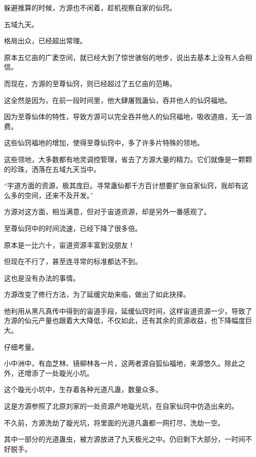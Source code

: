 
\begin{this_body}



躲避推算的时候，方源也不闲着，趁机视察自家的仙窍。

五域九天。

格局出众，已经超出常理。

原本五亿亩的广袤空间，就已经大到了惊世骇俗的地步，说出去基本上没有人会相信。

而现在，方源的至尊仙窍，则已经超过了五亿亩的范畴。

这全然是因为，在前一段时间里，他大肆屠戮蛊仙，吞并他人的仙窍福地。

因为至尊仙体的特性，导致方源可以完全吞并他人的仙窍福地，吸收道痕，无一浪费。

这些仙窍福地的增加，使得至尊仙窍中，多了许多片特殊的领地。

这些领地，大多数都有地灵调控管理，省去了方源大量的精力。它们就像是一颗颗的珍珠，洒落在五域九天当中。

“宇道方面的资源，极其庞巨。寻常蛊仙都千方百计想要扩张自家仙窍，我却有这么多的空间，还来不及开发。”

方源对这方面，相当满意，但对于宙道资源，却是另外一番感观了。

至尊仙窍中的时间流速，已经下降了很多倍。

原本是一比六十，宙道资源丰富到没朋友！

但现在不行了，甚至连寻常的标准都达不到。

这也是没有办法的事情。

方源改变了修行方法，为了延缓灾劫来临，做出了如此抉择。

他利用从黑凡真传中得到的宙道手段，延缓仙窍时间，这样宙道资源一少，导致了方源的仙元产量也跟着大大降低，不仅如此，还有其余的资源收益，也下降幅度巨大。

仔细考量。

小中洲中，有血芝林、镜柳林各一片，这两者源自狐仙福地，来源悠久。除此之外，还增添了一处璇光小坑。

这个璇光小坑中，生存着各种光道凡蛊，数量众多。

这是方源参照了北原刘家的一处资源产地璇光坑，在自家仙窍中仿造出来的。

不久前，方源洗劫了璇光坑，将里面的光道凡蛊都一网打尽，洗劫一空。

其中一部分的光道蛊虫，被方源放进了九天极光之中。仍旧剩下大部分，一时间不好脱手。


\end{this_body}
